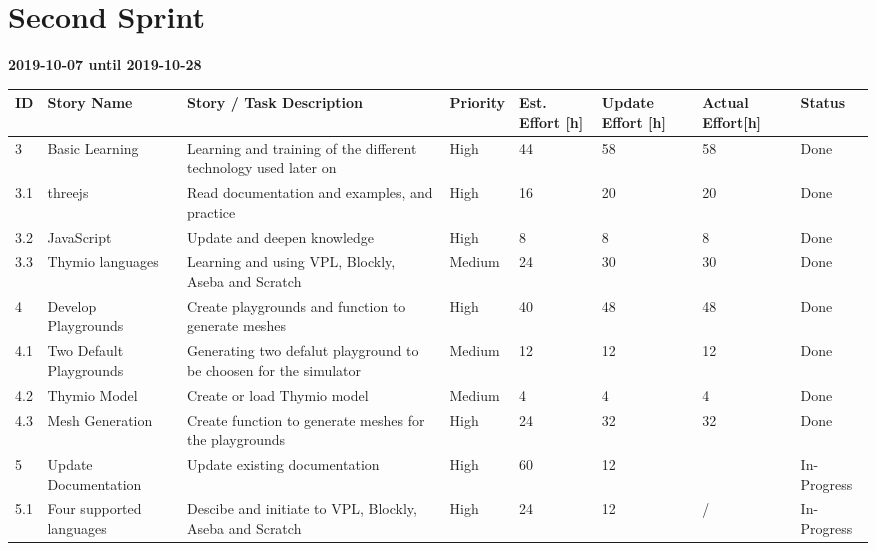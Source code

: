 \documentclass{scrbook}
\begin{document}
\section{Second Sprint}
\textbf{2019-10-07 until 2019-10-28}
\begin{longtable}{p{5mm}|p{2cm}|p{4cm}|p{1cm}|p{1cm}|p{1cm}|p{1cm}|p{15mm}}
  ID                     & Story Name & Story / Task Description & Priority & Est. Effort {[}h{]} & Update Effort {[}h{]} & Actual Effort{[}h{]} & Status                \\ \hline
  3 & Basic Learning & Learning and training of the different technology used later on & High & 44 & 58 & 58 & Done \\
  3.1 & threejs & Read documentation and examples, and practice & High & 16 & 20 & 20 & Done \\ 
  3.2 & JavaScript & Update and deepen knowledge  & High & 8 & 8 & 8 & Done \\ 
  3.3 & Thymio languages & Learning and using VPL, Blockly, Aseba and Scratch & Medium & 24 & 30 & 30 & Done \\ 
  4 & Develop Playgrounds & Create playgrounds and function to generate meshes & High & 40 & 48 & 48 & Done \\ 
  4.1 & Two Default Playgrounds & Generating two defalut playground to be choosen for the simulator & Medium & 12 & 12 & 12 & Done \\ 
  4.2 & Thymio Model & Create or load Thymio model & Medium & 4 & 4 & 4 & Done \\ 
  4.3 & Mesh Generation & Create function to generate meshes for the playgrounds & High & 24 & 32 & 32 & Done \\ 
  5 & Update Documentation & Update existing documentation & High & 60 & 12 &  & In-Progress \\
  5.1 & Four supported languages & Descibe and initiate to VPL, Blockly, Aseba and Scratch & High & 24 & 12 & {/} & In-Progress \\ 
\end{longtable}
\end{document}
